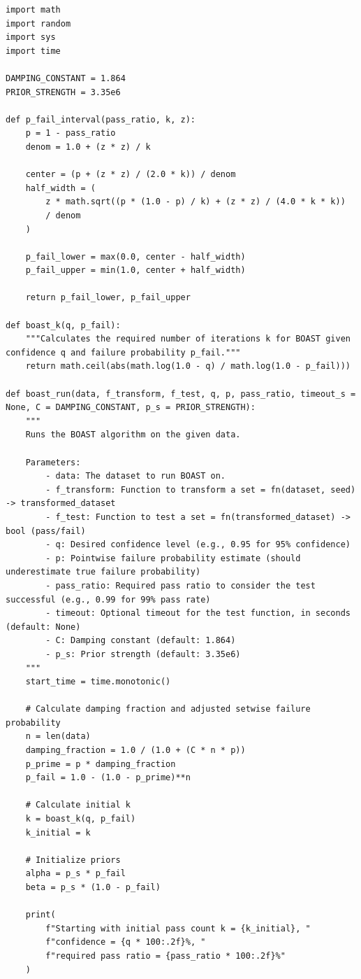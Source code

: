 \begin{lstlisting}
import math
import random
import sys
import time

DAMPING_CONSTANT = 1.864
PRIOR_STRENGTH = 3.35e6

def p_fail_interval(pass_ratio, k, z):
    p = 1 - pass_ratio
    denom = 1.0 + (z * z) / k

    center = (p + (z * z) / (2.0 * k)) / denom
    half_width = (
        z * math.sqrt((p * (1.0 - p) / k) + (z * z) / (4.0 * k * k))
        / denom
    )

    p_fail_lower = max(0.0, center - half_width)
    p_fail_upper = min(1.0, center + half_width)

    return p_fail_lower, p_fail_upper

def boast_k(q, p_fail):
    """Calculates the required number of iterations k for BOAST given confidence q and failure probability p_fail."""
    return math.ceil(abs(math.log(1.0 - q) / math.log(1.0 - p_fail)))

def boast_run(data, f_transform, f_test, q, p, pass_ratio, timeout_s = None, C = DAMPING_CONSTANT, p_s = PRIOR_STRENGTH):
    """
    Runs the BOAST algorithm on the given data.

    Parameters:
        - data: The dataset to run BOAST on.
        - f_transform: Function to transform a set = fn(dataset, seed) -> transformed_dataset
        - f_test: Function to test a set = fn(transformed_dataset) -> bool (pass/fail)
        - q: Desired confidence level (e.g., 0.95 for 95% confidence)
        - p: Pointwise failure probability estimate (should underestimate true failure probability)
        - pass_ratio: Required pass ratio to consider the test successful (e.g., 0.99 for 99% pass rate)
        - timeout: Optional timeout for the test function, in seconds (default: None)
        - C: Damping constant (default: 1.864)
        - p_s: Prior strength (default: 3.35e6)
    """
    start_time = time.monotonic()

    # Calculate damping fraction and adjusted setwise failure probability
    n = len(data)
    damping_fraction = 1.0 / (1.0 + (C * n * p))
    p_prime = p * damping_fraction
    p_fail = 1.0 - (1.0 - p_prime)**n

    # Calculate initial k
    k = boast_k(q, p_fail)
    k_initial = k

    # Initialize priors
    alpha = p_s * p_fail
    beta = p_s * (1.0 - p_fail)

    print(
        f"Starting with initial pass count k = {k_initial}, "
        f"confidence = {q * 100:.2f}%, "
        f"required pass ratio = {pass_ratio * 100:.2f}%"
    )


\end{lstlisting}
